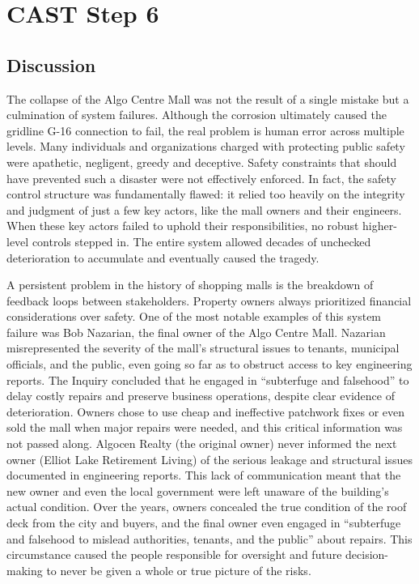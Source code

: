 \documentclass[12pt]{article}
\begin{document}


\section{CAST Step 6}
\subsection{Discussion}

The collapse of the Algo Centre Mall was not the result of a single mistake but a culmination of system failures. Although the corrosion ultimately caused the gridline G-16 connection to fail, the real problem is human error across multiple levels. Many individuals and organizations charged with protecting public safety were apathetic, negligent, greedy and deceptive. Safety constraints that should have prevented such a disaster were not effectively enforced. In fact, the safety control structure was fundamentally flawed: it relied too heavily on the integrity and judgment of just a few key actors, like the mall owners and their engineers. When these key actors failed to uphold their responsibilities, no robust higher-level controls stepped in. The entire system allowed decades of unchecked deterioration to accumulate and eventually caused the tragedy.

A persistent problem in the history of shopping malls is the breakdown of feedback loops between stakeholders. Property owners always prioritized financial considerations over safety. One of the most notable examples of this system failure was Bob Nazarian, the final owner of the Algo Centre Mall. Nazarian misrepresented the severity of the mall's structural issues to tenants, municipal officials, and the public, even going so far as to obstruct access to key engineering reports. The Inquiry concluded that he engaged in “subterfuge and falsehood” to delay costly repairs and preserve business operations, despite clear evidence of deterioration. Owners chose to use cheap and ineffective patchwork fixes or even sold the mall when major repairs were needed, and this critical information was not passed along. Algocen Realty (the original owner) never informed the next owner (Elliot Lake Retirement Living) of the serious leakage and structural issues documented in engineering reports. This lack of communication meant that the new owner and even the local government were left unaware of the building’s actual condition. Over the years, owners concealed the true condition of the roof deck from the city and buyers, and the final owner even engaged in “subterfuge and falsehood to mislead authorities, tenants, and the public” about repairs. This circumstance caused the people responsible for oversight and future decision-making to never be given a whole or true picture of the risks.
\end{document}
